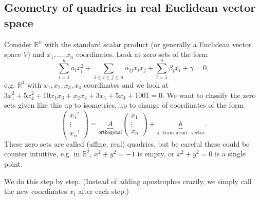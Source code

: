 \documentclass[a4paper]{article}
\theoremstyle{definition}
\begin{document}
\subsection{Geometry of quadrics in real Euclidean vector space}
Consider $\mathbb R^n$ with the standard scalar product (or generally a Euclidean vector space $V$) and $x_1,\ldots,x_n$ coordinates. Look at zero sets of the form
\[
\sum_{i=1}^n a_i x_i^2 + \sum_{1\leq i\leq j \leq n} \alpha_{ij}x_ix_j + \sum_{i=1}^n \beta_i x_i + \gamma =0, \tag{$\ast$}
\]
e.g. $\mathbb R^4$ with $x_1,x_2,x_3,x_4$ coordinates and we look at $3x_1^2+5x_4^2+10x_1x_3+x_2x_4+3x_1+5x_4+1001=0$. We want to classify the zero sets given like this up to isometries, up to change of coordinates of the form
\[
\begin{pmatrix}
x_1' \\ \vdots \\ x_n'
\end{pmatrix} = \underbrace{A}_{\text{orthogonal}}\begin{pmatrix}x_1\\ \vdots \\ x_n\end{pmatrix} + \underbrace{b}_{\text{a ``translation'' vector}} .
\]
These zero sets are called (affine, real) quadrics, but be careful these could be counter intuitive, e.g. in $\mathbb R^2$, $x^2+y^2=-1$ is empty, or $x^2+y^2=0$ is a single point.

We do this step by step. (Instead of adding apostrophes crazily, we simply call the new coordinates $x_i$ after each step.)
\end{document}
